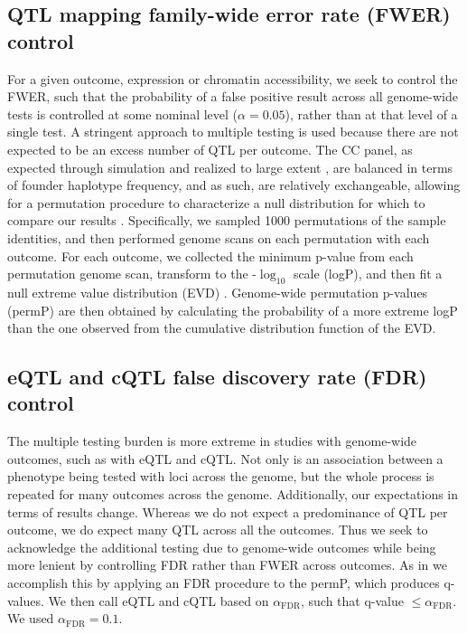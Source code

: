 \subsection{QTL mapping family-wide error rate (FWER) control}

For a given outcome, expression or chromatin accessibility, we seek to control the FWER, such that the probability of a false positive result across all genome-wide tests is controlled at some nominal level ($\alpha = 0.05$), rather than at that level of a single test. A stringent approach to multiple testing is used because there are not expected to be an excess number of QTL per outcome. The CC panel, as expected through simulation \citep{Valdar2006c} and realized to large extent \citep{Srivastava2017}, are balanced in terms of founder haplotype frequency, and as such, are relatively exchangeable, allowing for a permutation procedure to characterize a null distribution for which to compare our results \citep{Doerge1996}. Specifically, we sampled 1000 permutations of the sample identities, and then performed genome scans on each permutation with each outcome. For each outcome, we collected the minimum p-value from each permutation genome scan, transform to the -$\log_{10}$ scale (logP), and then fit a null extreme value distribution (EVD) \citep{Dudbridge2004,Valdar2006c}. Genome-wide permutation p-values (permP) are then obtained by calculating the probability of a more extreme logP than the one observed from the cumulative distribution function of the EVD.

\subsection{eQTL and cQTL false discovery rate (FDR) control}

The multiple testing burden is more extreme in studies with genome-wide outcomes, such as with eQTL and cQTL. Not only is an association between a phenotype being tested with loci across the genome, but the whole process is repeated for many outcomes across the genome. Additionally, our expectations in terms of results change. Whereas we do not expect a predominance of QTL per outcome, we do expect many QTL across all the outcomes. Thus we seek to acknowledge the additional testing due to genome-wide outcomes while being more lenient by controlling FDR rather than FWER across outcomes. As in \cite{Chick2016} we accomplish this by applying an FDR procedure \citep{Benjamini1995,Storey2003} to the permP, which produces q-values. We then call eQTL and cQTL based on $\alpha_{\text{FDR}}$, such that q-value $\le \alpha_{\text{FDR}}$. We used $\alpha_{\text{FDR}} = 0.1$.

